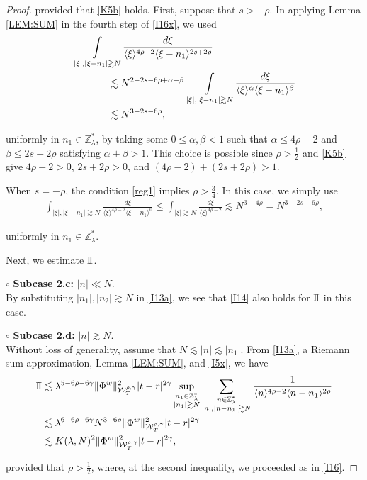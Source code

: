 \documentclass[letterpaper, 11pt,  reqno]{amsart}
\DeclareMathOperator*{\intt}{\int}
\newcommand{\1}{\hspace{0.5mm}\text{I}\hspace{0.5mm}}
\newcommand{\II}{\text{I \hspace{-2.8mm} I} }
\newcommand{\noi}{\noindent}
\newcommand{\Z}{\mathbb{Z}}
\newcommand{\al}{\alpha}
\newcommand{\be}{\beta}
\newcommand{\g}{\gamma}
\newcommand{\ld}{\lambda}
\newcommand{\les}{\lesssim}
\newcommand{\ges}{\gtrsim}
\newcommand{\jb}[1]
{\langle #1 \rangle}
\newcommand{\W}{\mathcal{W}}
\numberwithin{equation}{section}
\numberwithin{theorem}{section}
\begin{document}
\begin{proof}
\noi
provided that 
  \eqref{K5b} holds.
First, suppose that $s>-\rho$.
In applying Lemma \ref{LEM:SUM} in the fourth step of \eqref{I16x}, 
we used 
\begin{align}
\begin{aligned}
& \intt_{|\xi|, |\xi - n_1|\ges N} 
\frac{d\xi}{\jb{\xi}^{4\rho - 2}
\jb{ \xi - n_1}^{2s + 2\rho}}\\
& \hphantom{XXXX}
\les N^{2- 2s - 6\rho + \al +\be}
\intt_{|\xi|, |\xi - n_1|\ges N} 
\frac{d\xi}{\jb{\xi}^{\al}
\jb{ \xi - n_1}^{\be}}
\\
& \hphantom{XXXX}
 \les N^{3- 2s - 6\rho}, 
\end{aligned}
\label{I16}
\end{align}

\noi
uniformly in $n_1\in \Z_\ld^*$, 
by taking some $0 \le \al, \be < 1$
such that $\al \le 4\rho - 2$
and $ \be \le 2s + 2\rho$
satisfying $\al + \be > 1$.
This choice is possible since $\rho>\frac{1}{2}$ and \eqref{K5b} give
$4\rho-2>0$, $2s+2\rho>0$, and
$(4\rho-2)+(2s+2\rho)>1$.

When $s=-\rho$, the condition \eqref{reg1}
implies $\rho>\frac{3}{4}$.
In this case, we simply use 
\begin{align}
\intt_{|\xi|,|\xi-n_1|\ges N}
\frac{d\xi}{\jb{\xi}^{4\rho-2}\jb{\xi - n_1}^0}
\le \intt_{|\xi|\ges N}
\frac{d\xi}{\jb{\xi}^{4\rho-2}}
\les N^{3-4\rho}
=N^{3-2s-6\rho}, 
\label{I16x1}
\end{align}


\noi
uniformly in $n_1\in \Z_\ld^*$.

\medskip

Next, we  estimate $\II$.


\noi
$\circ$ {\bf Subcase 2.c:}  $|n| \ll N$.\\
\indent
By substituting  $|n_1|, |n_2|\ges N$ in \eqref{I13a}, 
we see that \eqref{I14} also holds for $\II$ in this case.





\medskip

\noi
$\circ$ {\bf Subcase 2.d:}  $|n| \ges N$.\\
\indent
Without loss of generality, assume that $N \les |n| \les |n_1|$.
From \eqref{I13a}, 
 a Riemann sum approximation, 
Lemma \ref{LEM:SUM}, 
and 
\eqref{I5x}, 
we have
\begin{align*}
\II
&\les 
\ld^{5-6\rho -6\g}
\| \Phi^{w} \|^2_{\W_{T}^{\rho, \g}} 
|t-r|^{2\g} 
\sup_{\substack{n_1 \in \Z_\ld^*\\|n_1|\ges N} }
\sum_{\substack{n \in \Z_\ld^*\\|n|, |n- n_1|\ges N}} 
\frac{1}{\jb{n}^{4\rho - 2}\jb{n - n_1}^{2\rho}}\\
 &\les 
\ld^{6-6\rho -6\g}N^{3-6\rho }
 \| \Phi^{w} \|^2_{\W_{T}^{\rho, \g}}  
|t-r|^{2\g}\\
 &\les 
K(\ld, N)^2
 \| \Phi^{w} \|^2_{\W_{T}^{\rho, \g}}  
|t-r|^{2\g}, 
\end{align*}

\noi
provided that $\rho > \frac 12$, 
where, at the second inequality, we proceeded as in \eqref{I16}.
\end{proof}
\end{document}
